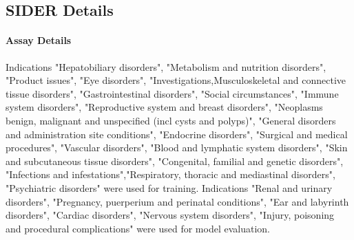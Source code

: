 \subsection{SIDER Details}
\paragraph{Assay Details}
Indications "Hepatobiliary disorders", "Metabolism and nutrition disorders", "Product issues", "Eye disorders", "Investigations,Musculoskeletal and connective tissue disorders", "Gastrointestinal disorders", "Social circumstances", "Immune system disorders", "Reproductive system and breast disorders", "Neoplasms benign, malignant and unspecified (incl cysts and polyps)", "General disorders and administration site conditions", "Endocrine disorders", "Surgical and medical procedures", "Vascular disorders", "Blood and lymphatic system disorders", "Skin and subcutaneous tissue disorders", "Congenital, familial and genetic disorders", "Infections and infestations","Respiratory, thoracic and mediastinal disorders", "Psychiatric disorders" were used for training. Indications "Renal and urinary disorders", "Pregnancy, puerperium and perinatal conditions", "Ear and labyrinth disorders", "Cardiac disorders", "Nervous system disorders", "Injury, poisoning and procedural complications" were used for model evaluation.

